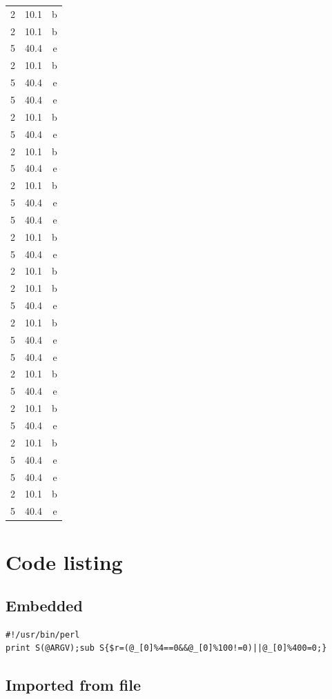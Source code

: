 \documentclass{article}
\begin{document}
\begin{longtable}[c]{l|S|r}
	2 & 10.1 & b \\ 
	2 & 10.1 & b \\ 
	5 & 40.4 & e \\ 
	2 & 10.1 & b \\ 
	5 & 40.4 & e \\ 
	5 & 40.4 & e \\ 
	2 & 10.1 & b \\ 
	5 & 40.4 & e \\ 
	2 & 10.1 & b \\ 
	5 & 40.4 & e \\ 
	2 & 10.1 & b \\ 
	5 & 40.4 & e \\ 
	5 & 40.4 & e \\ 
	2 & 10.1 & b \\ 
	5 & 40.4 & e \\ 
	2 & 10.1 & b \\ 
	2 & 10.1 & b \\ 
	5 & 40.4 & e \\ 
	2 & 10.1 & b \\ 
	5 & 40.4 & e \\ 
	5 & 40.4 & e \\ 
	2 & 10.1 & b \\ 
	5 & 40.4 & e \\ 
	2 & 10.1 & b \\ 
	5 & 40.4 & e \\ 
	2 & 10.1 & b \\ 
	5 & 40.4 & e \\ 
	5 & 40.4 & e \\ 
	2 & 10.1 & b \\ 
	5 & 40.4 & e \\ 
	\bottomrule
    \end{longtable}

    \newpage

    \section{Code listing}
    \subsection{Embedded}

    \begin{lstlisting}
#!/usr/bin/perl
print S(@ARGV);sub S{$r=(@_[0]%4==0&&@_[0]%100!=0)||@_[0]%400=0;}
    \end{lstlisting}

    \subsection{Imported from file}
\end{document}
